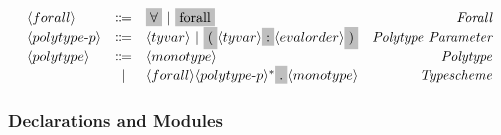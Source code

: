 \documentclass[11pt]{article}
\newcommand{\nonterminal}[1]{\langle #1 \rangle}
\newcommand{\terminal}[1]{\colorbox{lightgray}{\vphantom{X}#1}}
\begin{document}
\[\begin{array}{lclr}
    \nonterminal{forall} & \Coloneqq & \terminal{$\forall$}\ |\ \terminal{forall} & \emph{Forall} \\
    \nonterminal{polytype$-$p} & \Coloneqq & \nonterminal{tyvar}\ |\ \terminal{(} \nonterminal{tyvar} \terminal{:} \nonterminal{evalorder}\terminal{)} & \emph{Polytype Parameter} \\
    \nonterminal{polytype} & \Coloneqq & \nonterminal{monotype} & \emph{Polytype} \\
    & | & \nonterminal{forall} \nonterminal{polytype$-$p}^{\ast}\terminal{.} \nonterminal{monotype} & \emph{Typescheme} \\
  \end{array}
\]
\subsubsection{Declarations and Modules}
\end{document}
